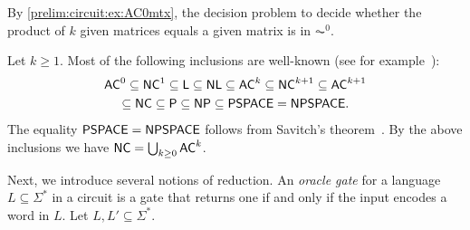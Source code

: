 By \cref{prelim:circuit:ex:AC0mtx}, the decision
problem to decide whether the product
of $k$ given matrices equals
a given matrix is in $\AC^0$.




Let $k \ge 1$. Most of the following inclusions are well-known (see for example~\cite{DBLP:series/eatcs/BalcazarDG90,DBLP:series/txtcs/BalcazarDG95,DBLP:journals/siamcomp/Borodin77,HopUll79,sipser2012theory,Vollmer99}):
\begin{multline}\label{prelim:eqn:cc_inclusions}
\textup{\textsf{AC}}^0 \subseteq \textup{\textsf{NC}}^1 \subseteq \textsf{L} \subseteq \textup{\textsf{NL}} \subseteq \textup{\textsf{AC}}^k \subseteq \textup{\textsf{NC}}^{k+1} \subseteq \textup{\textsf{AC}}^{k+1} \\
\subseteq \textup{\textsf{NC}} \subseteq \textup{\textsf{P}} \subseteq \textup{\textsf{NP}} \subseteq \textup{\textsf{PSPACE}} = \textup{\textsf{NPSPACE}}.
\end{multline}
The equality $\textup{\textsf{PSPACE}} = \textup{\textsf{NPSPACE}}$ 
follows from Savitch's theorem~\cite{DBLP:journals/jcss/Savitch70}.
By the above inclusions we have $\textup{\textsf{NC}} = \bigcup_{k \ge 0} \textup{\textsf{AC}}^k$.

\label{def:lelogm} 
\label{def:lePm} 
\label{def:leACZEROm} 
\label{def:eqlogm} 
\label{def:eqPm} 
\label{def:eqACZEROm} 
\label{def:leNCkm}
\label{def:eqNCkm}
\label{def:leNCkT}
\label{def:eqNCkT}
Next, we introduce several notions of reduction.
An \emph{oracle gate} for a language $L \subseteq \Sigma^*$  in a circuit 
is a gate that returns one if and only if the input encodes a word in $L$.
Let $L, L' \subseteq \Sigma^*$. %


